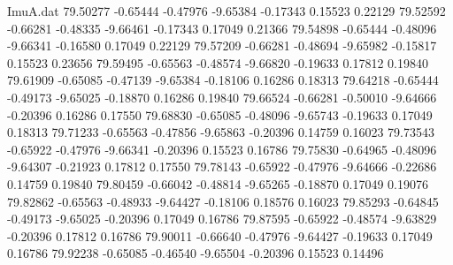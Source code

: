 \begin{filecontents}{ImuA.dat}
  79.50277   -0.65444   -0.47976   -9.65384   -0.17343    0.15523    0.22129
  79.52592   -0.66281   -0.48335   -9.66461   -0.17343    0.17049    0.21366
  79.54898   -0.65444   -0.48096   -9.66341   -0.16580    0.17049    0.22129
  79.57209   -0.66281   -0.48694   -9.65982   -0.15817    0.15523    0.23656
  79.59495   -0.65563   -0.48574   -9.66820   -0.19633    0.17812    0.19840
  79.61909   -0.65085   -0.47139   -9.65384   -0.18106    0.16286    0.18313
  79.64218   -0.65444   -0.49173   -9.65025   -0.18870    0.16286    0.19840
  79.66524   -0.66281   -0.50010   -9.64666   -0.20396    0.16286    0.17550
  79.68830   -0.65085   -0.48096   -9.65743   -0.19633    0.17049    0.18313
  79.71233   -0.65563   -0.47856   -9.65863   -0.20396    0.14759    0.16023
  79.73543   -0.65922   -0.47976   -9.66341   -0.20396    0.15523    0.16786
  79.75830   -0.64965   -0.48096   -9.64307   -0.21923    0.17812    0.17550
  79.78143   -0.65922   -0.47976   -9.64666   -0.22686    0.14759    0.19840
  79.80459   -0.66042   -0.48814   -9.65265   -0.18870    0.17049    0.19076
  79.82862   -0.65563   -0.48933   -9.64427   -0.18106    0.18576    0.16023
  79.85293   -0.64845   -0.49173   -9.65025   -0.20396    0.17049    0.16786
  79.87595   -0.65922   -0.48574   -9.63829   -0.20396    0.17812    0.16786
  79.90011   -0.66640   -0.47976   -9.64427   -0.19633    0.17049    0.16786
  79.92238   -0.65085   -0.46540   -9.65504   -0.20396    0.15523    0.14496
\end{filecontents}
